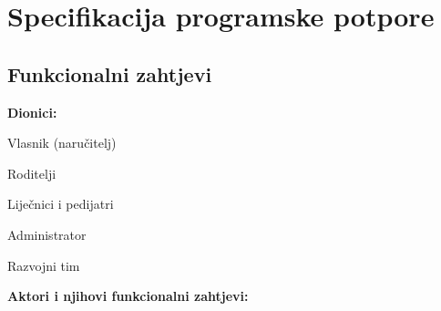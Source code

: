 \chapter{Specifikacija programske potpore}
		
	\section{Funkcionalni zahtjevi}
			\noindent \textbf{Dionici:}
			
			\begin{packed_enum}
				
				\item Vlasnik (naručitelj)
				\item Roditelji				
				\item Liječnici i pedijatri
				\item Administrator
				\item Razvojni tim
				
			\end{packed_enum}
			
			\noindent \textbf{Aktori i njihovi funkcionalni zahtjevi:}
			
